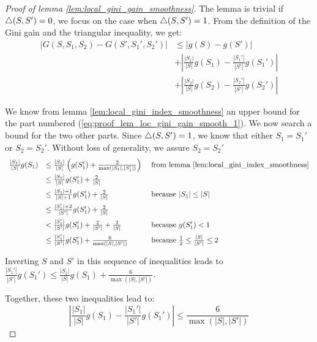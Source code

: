 \begin{proof}[Proof of lemma \ref{lem:local_gini_gain_smoothness}]
    The lemma is trivial if $\triangle(S, S') = 0$, we focus on the case when $\triangle(S, S') = 1$. From the definition of the Gini gain and the triangular inequality, we get:
    \begin{align}
        |G(S, S_1, S_2) - G(S', S_1', S_2')| &\leq |g(S) - g(S')|\label{eq:proof_lem_loc_gini_gain_smooth_1}\\
        &+ \left|\frac{|S_1|}{|S|}g(S_1) - \frac{|S_1'|}{|S'|}g(S_1')\right|\label{eq:proof_lem_loc_gini_gain_smooth_2}\\
        &+ \left|\frac{|S_2|}{|S|}g(S_2) - \frac{|S_2'|}{|S'|}g(S_2')\right|\label{eq:proof_lem_loc_gini_gain_smooth_3}
    \end{align}

    We know from lemma \ref{lem:local_gini_index_smoothness} an upper bound for the part numbered (\ref{eq:proof_lem_loc_gini_gain_smooth_1}). We now search a bound for the two other parts. Since $\triangle(S, S') = 1$, we know that either $S_1=S_1'$ or $S_2 = S_2'$. Without loss of generality, we assure $S_2 = S_2'$
    \begin{equation*}
        \begin{array}{lll}
             \frac{|S_1|}{|S|}g(S_1) & \leq  \frac{|S_1|}{|S|}\left(g(S_1') + \frac{2}{\max(|S_1|, |S_1'|)}\right) & \text{ from lemma \ref{lem:local_gini_index_smoothness}}\\[6pt]
              & \leq  \frac{|S_1|}{|S|}g(S_1') + \frac{2}{|S|} & \\[6pt]
              & \leq  \frac{|S_1|+1}{|S|+1}g(S_1') + \frac{2}{|S|} & \text{ because $|S_1| \leq |S|$}\\[6pt]
              & \leq  \frac{|S_1'|+2}{|S'|}g(S_1') + \frac{2}{|S|} &\\[6pt]
              & <  \frac{|S_1'|}{|S'|}g(S_1') + \frac{2}{|S'|} + \frac{2}{|S|} & \text{ because $g(S_1') < 1$}\\[6pt]
              & \leq \frac{|S_1'|}{|S'|}g(S_1') + \frac{6}{\max(|S|, |S'|)} & \text{ because $\frac{1}{2}\leq \frac{|S|}{|S'|} \leq 2$}\\[6pt]
        \end{array}
    \end{equation*}
    Inverting $S$ and $S'$ in this sequence of inequalities leads to $\frac{|S_1'|}{|S'|}g(S_1')\leq \frac{|S_1|}{|S|}g(S_1) + \frac{6}{\max(|S|, |S'|)}$.
    
    Together, these two inequalities lead to:
    \begin{equation*}
        \left|\frac{|S_1|}{|S|}g(S_1) - \frac{|S_1'|}{|S'|}g(S_1')\right| \leq \frac{6}{\max(|S|, |S'|)}
    \end{equation*}


\end{proof}
